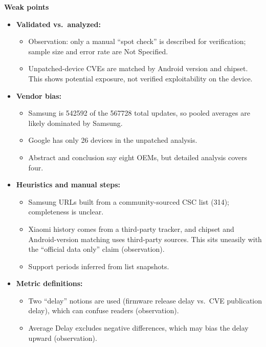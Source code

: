 \documentclass[11pt,a4paper]{article}
\begin{document}
\begin{enumerate}
    \vspace{4pt}
    \textbf{Weak points}
    \begin{itemize}[leftmargin=*,itemsep=1pt,topsep=2pt]
        \item \textbf{Validated vs.\ analyzed:}
        \begin{itemize}[itemsep=0pt]
            \item Observation: only a manual ``spot check'' is described for verification; sample size and error rate are Not Specified.
            \item Unpatched-device CVEs are matched by Android version and chipset. This shows potential exposure, not verified exploitability on the device.
        \end{itemize}
        \item \textbf{Vendor bias:}
        \begin{itemize}[itemsep=0pt]
            \item Samsung is 542592 of the 567728 total updates, so pooled averages are likely dominated by Samsung.
            \item Google has only 26 devices in the unpatched analysis.
            \item Abstract and conclusion say eight OEMs, but detailed analysis covers four.
        \end{itemize}
        \item \textbf{Heuristics and manual steps:}
        \begin{itemize}[itemsep=0pt]
            \item Samsung URLs built from a community-sourced CSC list (314); completeness is unclear.
            \item Xiaomi history comes from a third-party tracker, and chipset and Android-version matching uses third-party sources. This sits uneasily with the ``official data only'' claim (observation).
            \item Support periods inferred from list snapshots.
        \end{itemize}
        \item \textbf{Metric definitions:}
        \begin{itemize}[itemsep=0pt]
            \item Two ``delay'' notions are used (firmware release delay vs.\ CVE publication delay), which can confuse readers (observation).
            \item Average Delay excludes negative differences, which may bias the delay upward (observation).

\end{itemize}
\end{itemize}
\end{enumerate}
\end{document}
